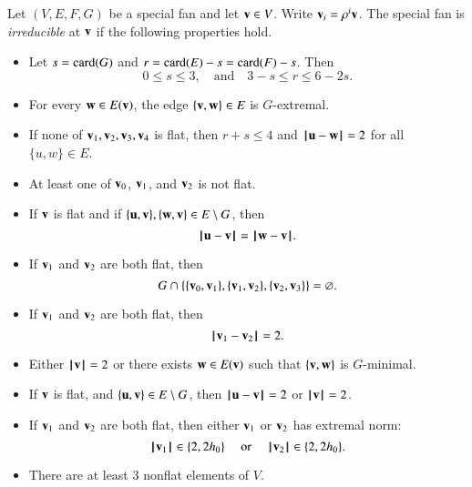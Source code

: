 \begin{definition}[irreducible]  Let $(V,E,F,G)$ be a special fan and let $\v\in V$.  
Write $\v_i  = \rho^i \v$.
The special fan is {\it irreducible} at $\v$
if the following properties hold. 
\begin{itemize}
\item {} %
 Let      $s=\card(G)$ and $r=\card(E) - s = \card(F)-s$.  Then
$$0\le s \le 3,\quad\text{and}\quad3-s \le r \le 6 - 2s.$$
\item {} For every $\w\in E(\v)$,  the edge $\{\v,\w\}\in E$ is $G$-extremal.
\item {}  If none of $\v_1,\v_2,\v_3,\v_4$ is flat, then $r+s\le 4$
and $\norm{\u}{\w}=2$ for all $\{u,w\}\in E$.
\item {} At least one of $\v_0$, $\v_1$, and $\v_2$ is not flat.
\item {} If $\v$ is flat and if $\{\u,\v\},\{\w,\v\}\in E\setminus G$, then
$$
\norm{\u}{\v} = \norm{\w}{\v}.
$$
\item {} If $\v_1$ and $\v_2$ are both flat, then 
$$G\cap \{\{\v_0,\v_1\},\{\v_1,\v_2\},\{\v_2,\v_3\}\} = \emptyset.$$
\item {} If $\v_1$ and $\v_2$ are both flat, then
$$
\norm{\v_1}{\v_2} = 2.
$$
\item {} Either $\normo{\v}=2$ or there exists $\w\in E(\v)$ such
that $\{\v,\w\}$ is $G$-minimal.
\item {} If $\v$ is flat, and $\{\u,\v\}\in E\setminus G$, then
$\norm{\u}{\v}=2$ or $\normo{\v}=2$.
\item {} If $\v_1$ and $\v_2$ are both flat, then either $\v_1$ or $\v_2$
has extremal norm:
$$\normo{\v_1}\in \{2,2\hm\}\quad\text{ or }\quad \normo{\v_2}\in \{2,2\hm\}.$$
\item {} There are at least $3$ nonflat elements of $V$.
\end{itemize}
\end{definition}



